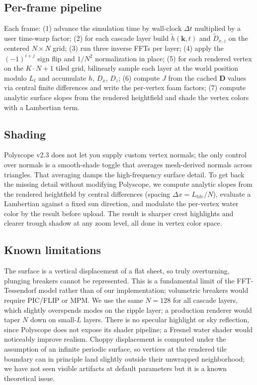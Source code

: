 \documentclass[10pt,letterpaper]{article}
\begin{document}
\subsection{Per-frame pipeline}
Each frame: (1) advance the simulation time by wall-clock $\Delta t$
multiplied by a user time-warp factor; (2) for each cascade layer build
$\tilde{h}(\mathbf{k},t)$ and $\tilde{D}_{x,z}$ on the centered $N\times N$
grid; (3) run three inverse FFTs per layer; (4) apply the $(-1)^{i+j}$
sign flip and $1/N^2$ normalization in place; (5) for each rendered
vertex on the $K\!\cdot\!N+1$ tiled grid, bilinearly sample each layer at
the world position modulo $L_\ell$ and accumulate $h$, $D_x$, $D_z$;
(6) compute $J$ from the cached $\mathbf{D}$ values via central finite
differences and write the per-vertex foam factors; (7) compute analytic
surface slopes from the rendered heightfield and shade the vertex colors
with a Lambertian term.

\subsection{Shading}
Polyscope v2.3 does not let you supply custom vertex normals; the only
control over normals is a smooth-shade toggle that averages mesh-derived
normals across triangles. That averaging damps the high-frequency surface
detail. To get back the missing detail without modifying Polyscope, we
compute analytic slopes from the rendered heightfield by central differences
(spacing $\Delta x = L_{tile}/N$), evaluate a Lambertian against a fixed
sun direction, and modulate the per-vertex water color by the result before
upload. The result is sharper crest highlights and clearer trough shadow at
any zoom level, all done in vertex color space.

\subsection{Known limitations}
The surface is a vertical displacement of a flat sheet, so truly
overturning, plunging breakers cannot be represented. This is a fundamental
limit of the FFT-Tessendorf model rather than of our implementation;
volumetric breakers would require PIC/FLIP or MPM. We use the same
$N=128$ for all cascade layers, which slightly overspends modes on the
ripple layer; a production renderer would taper $N$ down on small-$L$
layers. There is no specular highlight or sky reflection, since Polyscope
does not expose its shader pipeline; a Fresnel water shader would noticeably
improve realism. Choppy displacement is computed under the assumption of an
infinite periodic surface, so vertices at the rendered tile boundary can in
principle land slightly outside their unwrapped neighborhood; we have not
seen visible artifacts at default parameters but it is a known theoretical
issue.
\end{document}
